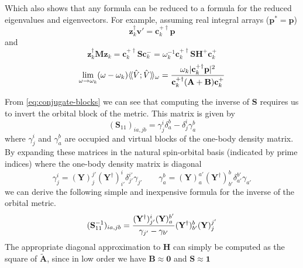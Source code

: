 Which also shows that any formula can be reduced to a formula for the reduced
eigenvalues and eigenvectors.
For example, assuming real integral arrays (\(\mathbf{p}^*=\mathbf{p}\))
\begin{equation}
    \mathbf{z}_k^\dagger
    \mathbf{v}'
    =
    \mathbf{c}_k^{+\dagger}
    \mathbf{p}
\end{equation}
and
\begin{equation}
    \mathbf{z}_k^\dagger
    \mathbf{M}
    \mathbf{z}_k
    =
    \mathbf{c}_k^{+\dagger}
    \mathbf{S}
    \mathbf{c}_k^{-}
    =
    \omega_k^{-1}
    \mathbf{c}_k^{+\dagger}
    \mathbf{S}
    \mathbf{H}^+
    \mathbf{c}_k^+
\end{equation}
\begin{equation}
    \lim_{\omega\rightarrow \omega_k}
    (\omega-\omega_k)
    \langle\!\langle \hat{V}; \hat{V} \rangle\!\rangle_\omega
    =
    \frac{%
        \omega_k
        |\mathbf{c}_k^{+\dagger} \mathbf{p}|^2
    }{%
        \mathbf{c}_k^{+\dagger} 
        (\mathbf{A} + \mathbf{B})
        \mathbf{c}_k^+
    }
\end{equation}


From \cref{eq:conjugate-blocks} we can see that computing the inverse of
\(\mathbf{S}\) requires us to invert the orbital block of the metric.
This matrix is given by
\begin{equation}
    (\mathbf{S}_{11})_{ia,jb}
    =
    \gamma^i_j
    \delta_a^b
    -
    \delta_j^i
    \gamma^b_a
\end{equation}
where
\(
    \gamma_j^i
\)
and
\(
    \gamma_a^b
\)
are occupied and virtual blocks of the one-body density matrix.
By expanding these matrices in the natural spin-orbital basis (indicated by
prime indices) where the one-body density matrix is diagonal
\begin{equation}
    \gamma_j^i
    =
    (\mathbf{Y})_j^{j'}
    (\mathbf{Y}^\dagger)_{i'}^i
    \delta_{j'}^{i'}
    \gamma_{j'}
    \qquad
    \gamma_a^b
    =
    (\mathbf{Y})_a^{a'}
    (\mathbf{Y}^\dagger)_{b'}^b
    \delta_{a'}^{b'}
    \gamma_{a'}
\end{equation}
we can derive the following simple and inexpensive formula for the inverse of
the orbital metric.
\begin{equation}
    (\mathbf{S}_{11}^{-1})_{ia,jb}
    =
    \frac{%
        (\mathbf{Y}^\dagger)_{j'}^i
        (\mathbf{Y})_a^{b'}
    }{%
        \gamma_{j'}-\gamma_{b'}
    }
    (\mathbf{Y}^\dagger)_{b'}^b
    (\mathbf{Y})_j^{j'}
\end{equation}
The appropriate diagonal approximation to \(\mathbf{H}\) can simply be computed
as the square of \(\tilde{\mathbf{A}}\), since in low order we have
\(\mathbf{B}\approx\mathbf{0}\) and \(\mathbf{S}\approx\mathbf{1}\)


